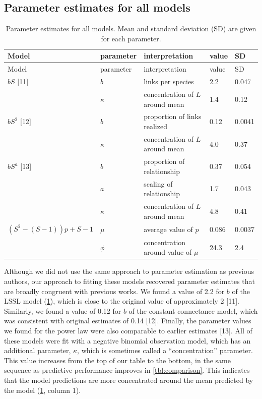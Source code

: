 \documentclass[12pt]{article}
\begin{document}
\hypertarget{parameter-estimates-for-all-models}{%
\subsection{Parameter estimates for all
models}\label{parameter-estimates-for-all-models}}

\begin{longtable}[]{@{}lllll@{}}
\caption{Parameter estimates for all models. Mean and standard deviation
(SD) are given for each parameter.
\label{tbl:parameters}}\tabularnewline
\toprule
Model & parameter & interpretation & value & SD\tabularnewline
\midrule
\endfirsthead
\toprule
Model & parameter & interpretation & value & SD\tabularnewline
\midrule
\endhead
\(bS\) {[}11{]} & \(b\) & links per species & 2.2 & 0.047\tabularnewline
& \(\kappa\) & concentration of \(L\) around mean & 1.4 &
0.12\tabularnewline
\(bS^2\) {[}12{]} & \(b\) & proportion of links realized & 0.12 &
0.0041\tabularnewline
& \(\kappa\) & concentration of \(L\) around mean & 4.0 &
0.37\tabularnewline
\(bS^a\) {[}13{]} & \(b\) & proportion of relationship & 0.37 &
0.054\tabularnewline
& \(a\) & scaling of relationship & 1.7 & 0.043\tabularnewline
& \(\kappa\) & concentration of \(L\) around mean & 4.8 &
0.41\tabularnewline
\((S^2 - (S - 1))p + S - 1\) & \(\mu\) & average value of \(p\) & 0.086
& 0.0037\tabularnewline
& \(\phi\) & concentration around value of \(\mu\) & 24.3 &
2.4\tabularnewline
\bottomrule
\end{longtable}

Although we did not use the same approach to parameter estimation as
previous authors, our approach to fitting these models recovered
parameter estimates that are broadly congruent with previous works. We
found a value of 2.2 for \(b\) of the LSSL model
(\cref{tbl:parameters}), which is close to the original value of
approximately 2 {[}11{]}. Similarly, we found a value of 0.12 for \(b\)
of the constant connectance model, which was consistent with original
estimates of 0.14 {[}12{]}. Finally, the parameter values we found for
the power law were also comparable to earlier estimates {[}13{]}. All of
these models were fit with a negative binomial observation model, which
has an additional parameter, \(\kappa\), which is sometimes called a
``concentration'' parameter. This value increases from the top of our
table to the bottom, in the same sequence as predictive performance
improves in \cref{tbl:comparison}. This indicates that the model
predictions are more concentrated around the mean predicted by the model
(\cref{tbl:parameters}, column 1).
\end{document}
